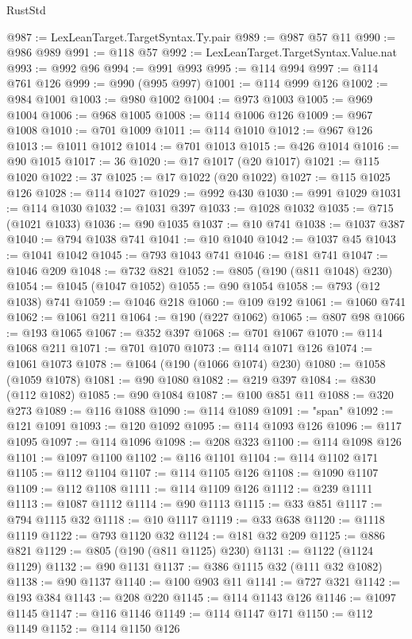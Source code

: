 \begin{lexlean}{RustStd}
\begin{coremodule}
@987 := LexLeanTarget.TargetSyntax.Ty.pair
@989 := @987 @57 @11
@990 := @986 @989
@991 := @118 @57
@992 := LexLeanTarget.TargetSyntax.Value.nat
@993 := @992 @96
@994 := @991 @993
@995 := @114 @994
@997 := @114 @761 @126
@999 := @990 (@995 @997)
@1001 := @114 @999 @126
@1002 := @984 @1001
@1003 := @980 @1002
@1004 := @973 @1003
@1005 := @969 @1004
@1006 := @968 @1005
@1008 := @114 @1006 @126
@1009 := @967 @1008
@1010 := @701 @1009
@1011 := @114 @1010
@1012 := @967 @126
@1013 := @1011 @1012
@1014 := @701 @1013
@1015 := @426 @1014
@1016 := @90 @1015
@1017 := 36
@1020 := @17 @1017 (@20 @1017)
@1021 := @115 @1020
@1022 := 37
@1025 := @17 @1022 (@20 @1022)
@1027 := @115 @1025 @126
@1028 := @114 @1027
@1029 := @992 @430
@1030 := @991 @1029
@1031 := @114 @1030
@1032 := @1031 @397
@1033 := @1028 @1032
@1035 := @715 (@1021 @1033)
@1036 := @90 @1035
@1037 := @10 @741
@1038 := @1037 @387
@1040 := @794 @1038 @741
@1041 := @10 @1040
@1042 := @1037 @45
@1043 := @1041 @1042
@1045 := @793 @1043 @741
@1046 := @181 @741
@1047 := @1046 @209
@1048 := @732 @821
@1052 := @805 (@190 (@811 @1048) @230)
@1054 := @1045 (@1047 @1052)
@1055 := @90 @1054
@1058 := @793 (@12 @1038) @741
@1059 := @1046 @218
@1060 := @109 @192
@1061 := @1060 @741
@1062 := @1061 @211
@1064 := @190 (@227 @1062)
@1065 := @807 @98
@1066 := @193 @1065
@1067 := @352 @397
@1068 := @701 @1067
@1070 := @114 @1068 @211
@1071 := @701 @1070
@1073 := @114 @1071 @126
@1074 := @1061 @1073
@1078 := @1064 (@190 (@1066 @1074) @230)
@1080 := @1058 (@1059 @1078)
@1081 := @90 @1080
@1082 := @219 @397
@1084 := @830 (@112 @1082)
@1085 := @90 @1084
@1087 := @100 @851 @11
@1088 := @320 @273
@1089 := @116 @1088
@1090 := @114 @1089
@1091 := "span"
@1092 := @121 @1091
@1093 := @120 @1092
@1095 := @114 @1093 @126
@1096 := @117 @1095
@1097 := @114 @1096
@1098 := @208 @323
@1100 := @114 @1098 @126
@1101 := @1097 @1100
@1102 := @116 @1101
@1104 := @114 @1102 @171
@1105 := @112 @1104
@1107 := @114 @1105 @126
@1108 := @1090 @1107
@1109 := @112 @1108
@1111 := @114 @1109 @126
@1112 := @239 @1111
@1113 := @1087 @1112
@1114 := @90 @1113
@1115 := @33 @851
@1117 := @794 @1115 @32
@1118 := @10 @1117
@1119 := @33 @638
@1120 := @1118 @1119
@1122 := @793 @1120 @32
@1124 := @181 @32 @209
@1125 := @886 @821
@1129 := @805 (@190 (@811 @1125) @230)
@1131 := @1122 (@1124 @1129)
@1132 := @90 @1131
@1137 := @386 @1115 @32 (@111 @32 @1082)
@1138 := @90 @1137
@1140 := @100 @903 @11
@1141 := @727 @321
@1142 := @193 @384
@1143 := @208 @220
@1145 := @114 @1143 @126
@1146 := @1097 @1145
@1147 := @116 @1146
@1149 := @114 @1147 @171
@1150 := @112 @1149
@1152 := @114 @1150 @126

\end{coremodule}
\end{lexlean}
